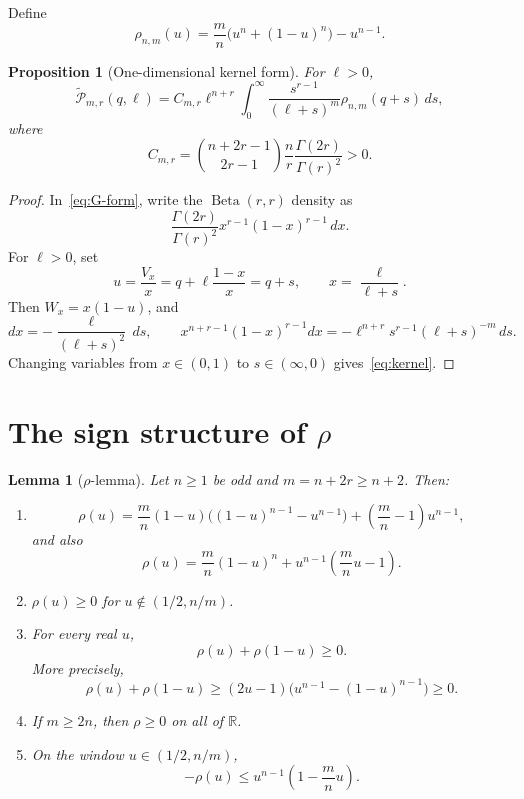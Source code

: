 \documentclass[11pt]{article}
\newtheorem{lemma}[theorem]{Lemma}
\newtheorem{proposition}[theorem]{Proposition}
\newcommand{\wtP}{\widetilde{\mathcal P}}
\newcommand{\Betad}{\operatorname{Beta}}
\begin{document}
Define
\begin{equation}\label{eq:rho-def}
        \rho_{n,m}(u)=\frac mn\bigl(u^n+(1-u)^n\bigr)-u^{n-1}.
\end{equation}

\begin{proposition}[One-dimensional kernel form]\label{prop:kernel}
For $\ell>0$,
\begin{equation}\label{eq:kernel}
        \wtP_{m,r}(q,\ell)=C_{m,r}\ell^{n+r}
        \int_0^\infty \frac{s^{r-1}}{(\ell+s)^m}\rho_{n,m}(q+s)\,ds,
\end{equation}
where
\[
        C_{m,r}=\binom{n+2r-1}{2r-1}\frac nr\frac{\Gamma(2r)}{\Gamma(r)^2}>0.
\]
\end{proposition}

\begin{proof}
In~\eqref{eq:G-form}, write the $\Betad(r,r)$ density as
\[
        \frac{\Gamma(2r)}{\Gamma(r)^2}x^{r-1}(1-x)^{r-1}\,dx.
\]
For $\ell>0$, set
\[
        u=\frac{V_x}{x}=q+\ell\frac{1-x}{x}=q+s,
        \qquad
        x=\frac{\ell}{\ell+s}.
\]
Then $W_x=x(1-u)$, and
\[
        dx=-\frac{\ell}{(\ell+s)^2}\,ds,
        \qquad
        x^{n+r-1}(1-x)^{r-1}dx
        =-\ell^{n+r}s^{r-1}(\ell+s)^{-m}\,ds.
\]
Changing variables from $x\in(0,1)$ to $s\in(\infty,0)$ gives~\eqref{eq:kernel}.
\end{proof}

\section{The sign structure of $\rho$}

\begin{lemma}[$\rho$-lemma]\label{lem:rho}
Let $n\ge1$ be odd and $m=n+2r\ge n+2$.  Then:
\begin{enumerate}[label=\textup{(\roman*)}]
\item\label{rho-group}
\[
        \rho(u)=\frac mn(1-u)\bigl((1-u)^{n-1}-u^{n-1}\bigr)
        +\left(\frac mn-1\right)u^{n-1},
\]
and also
\[
        \rho(u)=\frac mn(1-u)^n+u^{n-1}\left(\frac mn u-1\right).
\]
\item\label{rho-window}
$\rho(u)\ge0$ for $u\notin(1/2,n/m)$.
\item\label{rho-reflect}
For every real $u$,
\[
        \rho(u)+\rho(1-u)\ge0.
\]
More precisely,
\[
        \rho(u)+\rho(1-u)
        \ge (2u-1)\bigl(u^{n-1}-(1-u)^{n-1}\bigr)\ge0.
\]
\item\label{rho-empty}
If $m\ge2n$, then $\rho\ge0$ on all of $\mathbb R$.
\item\label{rho-neg}
On the window $u\in(1/2,n/m)$,
\[
        -\rho(u)\le u^{n-1}\left(1-\frac mn u\right).
\]
\end{enumerate}
\end{lemma}
\end{document}
